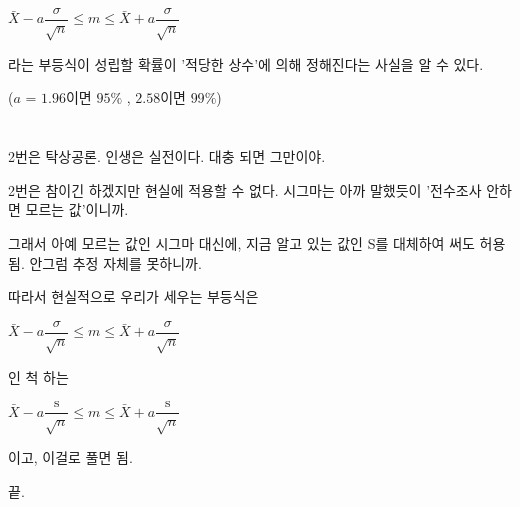 \documentclass{oblivoir}
\begin{document}
$\bar{X} - a\dfrac{\sigma}{\sqrt{n}}\le m \le \bar{X} + a\dfrac{\sigma}{\sqrt{n}}$
\par
라는 부등식이 성립할 확률이 '적당한 상수'에 의해 정해진다는 사실을 알 수 있다.\par
($a$ = $1.96$이면 $95\%$ , $2.58$이면 $99\%$)
\par\par

\section{}
2번은 탁상공론. 인생은 실전이다. 대충 되면 그만이야.\par
2번은 참이긴 하겠지만 현실에 적용할 수 없다. 시그마는 아까 말했듯이 '전수조사 안하면 모르는 값'이니까.\par
그래서 아예 모르는 값인 시그마 대신에, 지금 알고 있는 값인 S를 대체하여 써도 허용됨. 안그럼 추정 자체를 못하니까.\par
\par
따라서 현실적으로 우리가 세우는 부등식은\par
\par
$\bar{X} - a\dfrac{\sigma}{\sqrt{n}}\le m \le \bar{X} + a\dfrac{\sigma}{\sqrt{n}}$\par
인 척 하는\par
$\bar{X} - a\dfrac{\mathrm{s}}{\sqrt{n}}\le m \le \bar{X} + a\dfrac{\mathrm{s}}{\sqrt{n}}$\par
이고, 이걸로 풀면 됨.\par
\par
끝.
\end{document}
